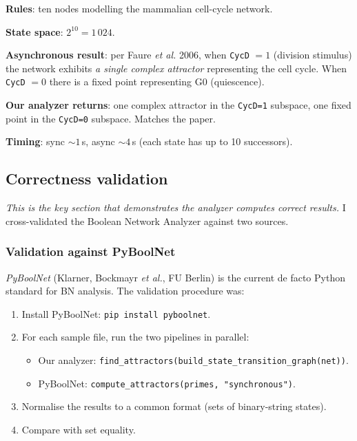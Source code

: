 \documentclass[oneside,final]{hcmut-report}
\begin{document}
\textbf{Rules}: ten nodes modelling the mammalian cell-cycle network.

\textbf{State space}: $2^{10} = 1\,024$.

\textbf{Asynchronous result}: per Faure \emph{et al.} 2006, when \texttt{CycD} $= 1$ (division stimulus) the network exhibits \textit{a single complex attractor} representing the cell cycle. When \texttt{CycD} $= 0$ there is a fixed point representing G0 (quiescence).

\textbf{Our analyzer returns}: one complex attractor in the \texttt{CycD=1} subspace, one fixed point in the \texttt{CycD=0} subspace. Matches the paper.

\textbf{Timing}: sync $\sim 1$\,s, async $\sim 4$\,s (each state has up to 10 successors).

\subsection{Correctness validation}\label{subsec:validation}

\textit{This is the key section that demonstrates the analyzer computes correct results.} I cross-validated the Boolean Network Analyzer against two sources.

\subsubsection{Validation against PyBoolNet}

\textit{PyBoolNet} (Klarner, Bockmayr \emph{et al.}, FU Berlin) is the current de facto Python standard for BN analysis. The validation procedure was:

\begin{enumerate}[leftmargin=*]
    \item Install PyBoolNet: \texttt{pip install pyboolnet}.
    \item For each sample file, run the two pipelines in parallel:
    \begin{itemize}
        \item Our analyzer: \texttt{find\_attractors(build\_state\_transition\_graph(net))}.
        \item PyBoolNet: \texttt{compute\_attractors(primes, "synchronous")}.
    \end{itemize}
    \item Normalise the results to a common format (sets of binary-string states).
    \item Compare with set equality.
\end{enumerate}
\end{document}
